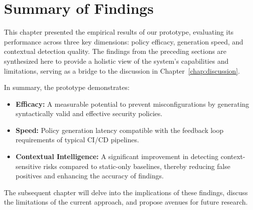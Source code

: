 
\section{Summary of Findings}\label{sec:summary-findings}

This chapter presented the empirical results of our prototype, evaluating its performance across three key dimensions: policy efficacy, generation speed, and contextual detection quality. The findings from the preceding sections are synthesized here to provide a holistic view of the system's capabilities and limitations, serving as a bridge to the discussion in Chapter~\ref{chap:discussion}.

In summary, the prototype demonstrates:
\begin{itemize}
    \item \textbf{Efficacy:} A measurable potential to prevent misconfigurations by generating syntactically valid and effective security policies.
    \item \textbf{Speed:} Policy generation latency compatible with the feedback loop requirements of typical CI/CD pipelines.
    \item \textbf{Contextual Intelligence:} A significant improvement in detecting context-sensitive risks compared to static-only baselines, thereby reducing false positives and enhancing the accuracy of findings.
\end{itemize}

The subsequent chapter will delve into the implications of these findings, discuss the limitations of the current approach, and propose avenues for future research.